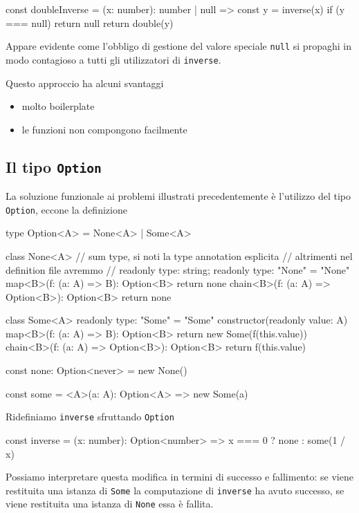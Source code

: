 \documentclass[12pt]{article}
\theoremstyle{definition}
\newenvironment{code}
  {\vspace{0.5cm} \VerbatimEnvironment\begin{typescriptcode}}
  {\end{typescriptcode} \vspace{0.2cm}}
\begin{document}
\begin{code}
const doubleInverse = (x: number): number | null => {
  const y = inverse(x)
  if (y === null) return null
  return double(y)
}
\end{code}

Appare evidente come l'obbligo di gestione del valore speciale \texttt{null} si propaghi in modo contagioso
a tutti gli utilizzatori di \texttt{inverse}.

Questo approccio ha alcuni svantaggi

\begin{itemize}
  \item molto boilerplate
  \item le funzioni non compongono facilmente
\end{itemize}

\subsection{Il tipo \texttt{Option}}

La soluzione funzionale ai problemi illustrati precedentemente è l'utilizzo del tipo \texttt{Option},
eccone la definizione

\begin{code}
type Option<A> = None<A> | Some<A>

class None<A> {
  // sum type, si noti la type annotation esplicita
  // altrimenti nel definition file avremmo
  // readonly type: string;
  readonly type: "None" = "None"
  map<B>(f: (a: A) => B): Option<B> {
    return none
  }
  chain<B>(f: (a: A) => Option<B>): Option<B> {
    return none
  }
}

class Some<A> {
  readonly type: "Some" = "Some"
  constructor(readonly value: A) {}
  map<B>(f: (a: A) => B): Option<B> {
    return new Some(f(this.value))
  }
  chain<B>(f: (a: A) => Option<B>): Option<B> {
    return f(this.value)
  }
}

const none: Option<never> = new None()

const some = <A>(a: A): Option<A> => new Some(a)
\end{code}

Ridefiniamo \texttt{inverse} sfruttando \texttt{Option}

\begin{code}
const inverse = (x: number): Option<number> =>
  x === 0 ? none : some(1 / x)
\end{code}

Possiamo interpretare questa modifica in termini di successo e fallimento: se viene restituita una istanza di \texttt{Some}
la computazione di \texttt{inverse} ha avuto successo, se viene restituita una istanza di \texttt{None} essa è fallita.
\end{document}
